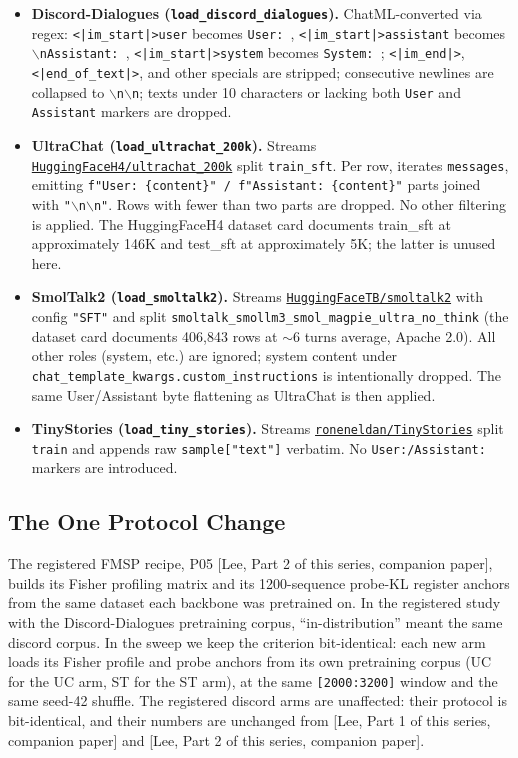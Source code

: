 \documentclass[11pt]{article}
\begin{document}
\begin{itemize}
  \item \textbf{Discord-Dialogues (\texttt{load\_discord\_dialogues}).} ChatML-converted via regex: \texttt{<|im\_start|>user} becomes \texttt{User: }, \texttt{<|im\_start|>assistant} becomes \texttt{$\backslash$nAssistant: }, \texttt{<|im\_start|>system} becomes \texttt{System: }; \texttt{<|im\_end|>}, \texttt{<|end\_of\_text|>}, and other specials are stripped; consecutive newlines are collapsed to \texttt{$\backslash$n$\backslash$n}; texts under 10 characters or lacking both \texttt{User} and \texttt{Assistant} markers are dropped.
  \item \textbf{UltraChat (\texttt{load\_ultrachat\_200k}).} Streams \href{https://huggingface.co/datasets/HuggingFaceH4/ultrachat_200k}{\texttt{HuggingFaceH4/ultrachat\_200k}} split \texttt{train\_sft}. Per row, iterates \texttt{messages}, emitting \texttt{f"User: \{content\}" / f"Assistant: \{content\}"} parts joined with \texttt{"$\backslash$n$\backslash$n"}. Rows with fewer than two parts are dropped. No other filtering is applied. The HuggingFaceH4 dataset card documents train\_sft at approximately 146K and test\_sft at approximately 5K; the latter is unused here.
  \item \textbf{SmolTalk2 (\texttt{load\_smoltalk2}).} Streams \href{https://huggingface.co/datasets/HuggingFaceTB/smoltalk2}{\texttt{HuggingFaceTB/smoltalk2}} with config \texttt{"SFT"} and split \texttt{smoltalk\_smollm3\_smol\_magpie\_ultra\_no\_think} (the dataset card documents 406,843 rows at $\sim$6 turns average, Apache 2.0). All other roles (system, etc.) are ignored; system content under \texttt{chat\_template\_kwargs.custom\_instructions} is intentionally dropped. The same User/Assistant byte flattening as UltraChat is then applied.
  \item \textbf{TinyStories (\texttt{load\_tiny\_stories}).} Streams \href{https://huggingface.co/datasets/roneneldan/TinyStories}{\texttt{roneneldan/TinyStories}} split \texttt{train} and appends raw \texttt{sample["text"]} verbatim. No \texttt{User:/Assistant:} markers are introduced.
\end{itemize}

\subsection{The One Protocol Change}

The registered FMSP recipe, P05 [Lee, Part 2 of this series, companion paper], builds its Fisher profiling matrix and its 1200-sequence probe-KL register anchors from the same dataset each backbone was pretrained on. In the registered study with the Discord-Dialogues pretraining corpus, ``in-distribution'' meant the same discord corpus. In the sweep we keep the criterion bit-identical: each new arm loads its Fisher profile and probe anchors from its own pretraining corpus (UC for the UC arm, ST for the ST arm), at the same \texttt{[2000:3200]} window and the same seed-42 shuffle. The registered discord arms are unaffected: their protocol is bit-identical, and their numbers are unchanged from [Lee, Part 1 of this series, companion paper] and [Lee, Part 2 of this series, companion paper].
\end{document}
